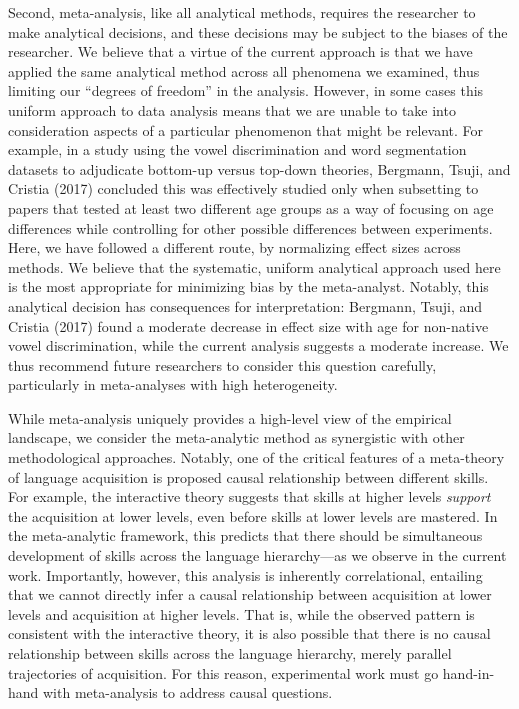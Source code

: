 \documentclass[english,floatsintext,man]{apa6}
\theoremstyle{definition}
\theoremstyle{definition}
\theoremstyle{remark}
\begin{document}
Second, meta-analysis, like all analytical methods, requires the
researcher to make analytical decisions, and these decisions may be
subject to the biases of the researcher. We believe that a virtue of the
current approach is that we have applied the same analytical method
across all phenomena we examined, thus limiting our \enquote{degrees of
freedom} in the analysis. However, in some cases this uniform approach
to data analysis means that we are unable to take into consideration
aspects of a particular phenomenon that might be relevant. For example,
in a study using the vowel discrimination and word segmentation datasets
to adjudicate bottom-up versus top-down theories, Bergmann, Tsuji, and
Cristia (2017) concluded this was effectively studied only when
subsetting to papers that tested at least two different age groups as a
way of focusing on age differences while controlling for other possible
differences between experiments. Here, we have followed a different
route, by normalizing effect sizes across methods. We believe that the
systematic, uniform analytical approach used here is the most
appropriate for minimizing bias by the meta-analyst. Notably, this
analytical decision has consequences for interpretation: Bergmann,
Tsuji, and Cristia (2017) found a moderate decrease in effect size with
age for non-native vowel discrimination, while the current analysis
suggests a moderate increase. We thus recommend future researchers to
consider this question carefully, particularly in meta-analyses with
high heterogeneity.

While meta-analysis uniquely provides a high-level view of the empirical
landscape, we consider the meta-analytic method as synergistic with
other methodological approaches. Notably, one of the critical features
of a meta-theory of language acquisition is proposed causal relationship
between different skills. For example, the interactive theory suggests
that skills at higher levels \emph{support} the acquisition at lower
levels, even before skills at lower levels are mastered. In the
meta-analytic framework, this predicts that there should be simultaneous
development of skills across the language hierarchy---as we observe in
the current work. Importantly, however, this analysis is inherently
correlational, entailing that we cannot directly infer a causal
relationship between acquisition at lower levels and acquisition at
higher levels. That is, while the observed pattern is consistent with
the interactive theory, it is also possible that there is no causal
relationship between skills across the language hierarchy, merely
parallel trajectories of acquisition. For this reason, experimental work
must go hand-in-hand with meta-analysis to address causal questions.
\end{document}
